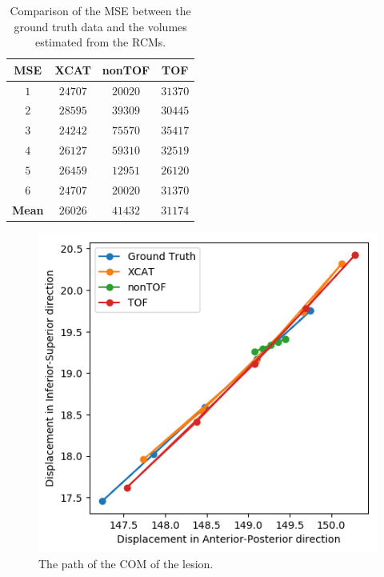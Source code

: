 \documentclass[portrait,color=UCLburgundy,margin=2cm]{uclposter}
\begin{document}
\begin{multicols}{2}

\begin{table}[H]
    \centering
    \caption{Comparison of the MSE between the ground truth data and the volumes estimated from the RCMs.}
    
    \vspace{1.0cm}
    
    \scalebox{1.6}
    {
        \begin{tabular}{||c|ccc||}
            \hline
                \textbf{MSE}    & \textbf{XCAT} & \textbf{nonTOF}   & \textbf{TOF}  \\
            \hline
                \textbf{$1$}    & $24707$       & $20020$           & $31370$       \\
                \textbf{$2$}    & $28595$       & $39309$           & $30445$       \\
                \textbf{$3$}    & $24242$       & $75570$           & $35417$       \\
                \textbf{$4$}    & $26127$       & $59310$           & $32519$       \\
                \textbf{$5$}    & $26459$       & $12951$           & $26120$       \\
                \textbf{$6$}    & $24707$       & $20020$           & $31370$       \\
            \hline
                \textbf{Mean}   & $26026$       & $41432$           & $31174$       \\
            \hline
        \end{tabular}
    }
    \label{tab:mse}
\end{table}

\begin{figure}[H]
    \centering
    \includegraphics[width=0.6\linewidth]{com_graph.png}
    \caption{The path of the COM of the lesion.}
    \label{fig:com_graph}
\end{figure}

\end{multicols}
\end{document}
